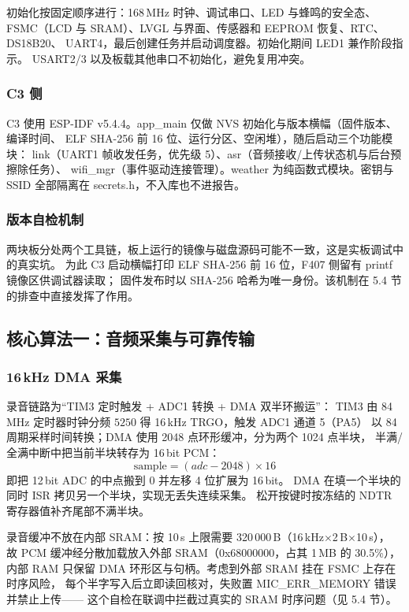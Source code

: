 初始化按固定顺序进行：168\,MHz 时钟、调试串口、LED 与蜂鸣的安全态、
FSMC（LCD 与 SRAM）、LVGL 与界面、传感器和 EEPROM 恢复、RTC、DS18B20、
UART4，最后创建任务并启动调度器。初始化期间 LED1 兼作阶段指示。
USART2/3 以及板载其他串口不初始化，避免复用冲突。

\subsubsection{C3 侧}
C3 使用 ESP-IDF v5.4.4。app\_main 仅做 NVS 初始化与版本横幅（固件版本、编译时间、
ELF SHA-256 前 16 位、运行分区、空闲堆），随后启动三个功能模块：
link（UART1 帧收发任务，优先级 5）、asr（音频接收/上传状态机与后台预擦除任务）、
wifi\_mgr（事件驱动连接管理）。weather 为纯函数式模块。密钥与 SSID 全部隔离在
secrets.h，不入库也不进报告。

\subsubsection{版本自检机制}
两块板分处两个工具链，板上运行的镜像与磁盘源码可能不一致，这是实板调试中的真实坑。
为此 C3 启动横幅打印 ELF SHA-256 前 16 位，F407 侧留有 printf 镜像区供调试器读取；
固件发布时以 SHA-256 哈希为唯一身份。该机制在 5.4 节的排查中直接发挥了作用。

\subsection{核心算法一：音频采集与可靠传输}
\subsubsection{\texorpdfstring{16\,kHz DMA 采集}{16 kHz DMA 采集}}
录音链路为``TIM3 定时触发 + ADC1 转换 + DMA 双半环搬运''：
TIM3 由 84\,MHz 定时器时钟分频 $5250$ 得 16\,kHz TRGO，触发 ADC1 通道 5（PA5）
以 84 周期采样时间转换；DMA 使用 2048 点环形缓冲，分为两个 1024 点半块，
半满/全满中断中把当前半块转存为 16\,bit PCM：
\[
\text{sample} = (adc - 2048) \times 16
\]
即把 12\,bit ADC 的中点搬到 0 并左移 4 位扩展为 16\,bit。
DMA 在填一个半块的同时 ISR 拷贝另一个半块，实现无丢失连续采集。
松开按键时按冻结的 NDTR 寄存器值补齐尾部不满半块。

录音缓冲不放在内部 SRAM：按 10\,s 上限需要 320\,000\,B（16\,kHz$\times$2\,B$\times$10\,s），
故 PCM 缓冲经分散加载放入外部 SRAM（0x68000000，占其 1\,MB 的 30.5\%），
内部 RAM 只保留 DMA 环形区与句柄。考虑到外部 SRAM 挂在 FSMC 上存在时序风险，
每个半字写入后立即读回核对，失败置 MIC\_ERR\_MEMORY 错误并禁止上传——
这个自检在联调中拦截过真实的 SRAM 时序问题（见 5.4 节）。

